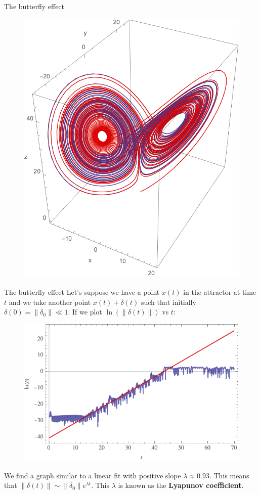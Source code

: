\documentclass[hyperref={pdfpagelabels=false}]{beamer}
\begin{document}
\begin{frame}{The butterfly effect}

\begin{figure}

\includegraphics[width=0.55\linewidth]{Figures/comparacionatractor3d.png}

\end{figure}

\end{frame}

\begin{frame}{The butterfly effect}
Let's suppose we have a point $x(t)$ in the attractor at time $t$ and we take another point $x(t)+\delta (t)$ such that initially $\delta(0)= \lVert \delta_{0} \rVert \ll 1$. If we plot $\ln(\lVert \delta(t)\rVert)$ vs $t$:

\begin{figure}

\includegraphics[width=0.6\linewidth]{Figures/ajuste.png}

\end{figure}
\vspace{-10pt}

We find a graph similar to a linear fit with positive slope $\lambda \approx 0.93$. This means that $\lVert \delta(t) \rVert \sim \lVert \delta_{0} \rVert e^{\lambda t}$. This $\lambda$ is known as the \textbf{Lyapunov coefficient}.

\end{frame}
\end{document}
